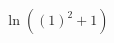\documentclass[preview]{standalone}
\begin{document}
\begin{align*}
\ln \left( { \left(1\right) }^{2} + 1 \right)
\end{align*}
\end{document}
